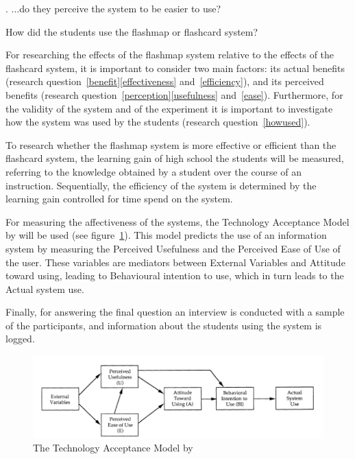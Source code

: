 \label{ease}
. ...do they perceive the system to be easier to use?

\label{howused}
 How did the students use the flashmap or flashcard system?

For researching the effects of the flashmap system relative to the effects of the flashcard system, it is important to consider two main factors: its actual benefits (research question~\ref{benefit}\ref{effectiveness} and~\ref{efficiency}), and its perceived benefits (research question~\ref{perception}\ref{usefulness} and~\ref{ease}). Furthermore, for the validity of the system and of the experiment it is important to investigate how the system was used by the students (research question~\ref{howused}).

To research whether the flashmap system is more effective or efficient than the flashcard system, the learning gain of high school the students will be measured, referring to the knowledge obtained by a student over the course of an instruction. Sequentially, the efficiency of the system is determined by the learning gain controlled for time spend on the system.

For measuring the affectiveness of the systems, the Technology Acceptance Model by  will be used (see figure~\ref{fig:tam}). This model predicts the use of an information system by measuring the Perceived Usefulness and the Perceived Ease of Use of the user. These variables are mediators between External Variables and Attitude toward using, leading to Behavioural intention to use, which in turn leads to the Actual system use.

Finally, for answering the final question an interview is conducted with a sample of the participants, and information about the students using the system is logged.

\begin{figure}
    \centering
    \includegraphics[width=\textwidth]{img/tam}
    \caption{The Technology Acceptance Model by \protect{}}
    \label{fig:tam}
\end{figure}

